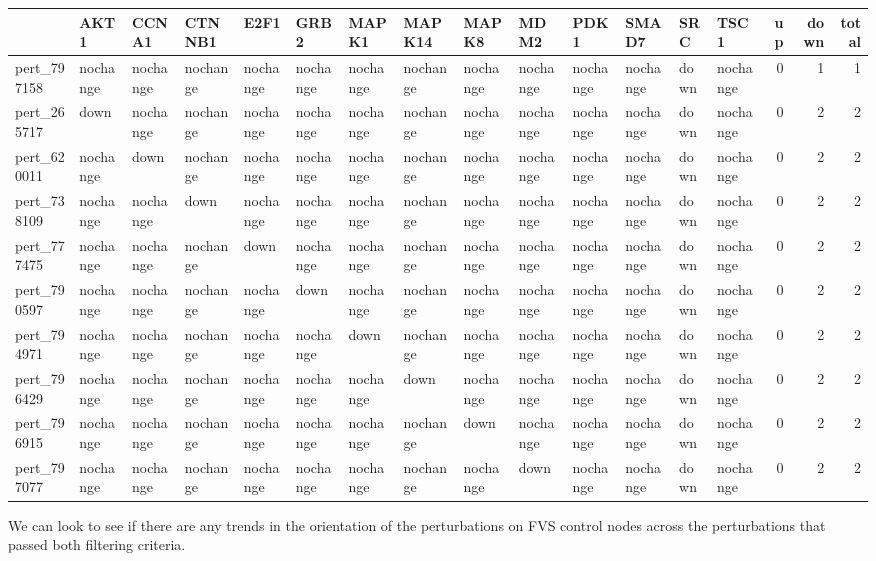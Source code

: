 \documentclass[
]{book}
\begin{document}
\begin{tabular}{l|l|l|l|l|l|l|l|l|l|l|l|l|l||>{}r|r|r}
\hline
  & AKT1 & CCNA1 & CTNNB1 & E2F1 & GRB2 & MAPK1 & MAPK14 & MAPK8 & MDM2 & PDK1 & SMAD7 & SRC & TSC1 & up & down & total\\
\hline
pert\_797158 & nochange & nochange & nochange & nochange & nochange & nochange & nochange & nochange & nochange & nochange & nochange & down & nochange & 0 & 1 & 1\\
\hline
pert\_265717 & down & nochange & nochange & nochange & nochange & nochange & nochange & nochange & nochange & nochange & nochange & down & nochange & 0 & 2 & 2\\
\hline
pert\_620011 & nochange & down & nochange & nochange & nochange & nochange & nochange & nochange & nochange & nochange & nochange & down & nochange & 0 & 2 & 2\\
\hline
pert\_738109 & nochange & nochange & down & nochange & nochange & nochange & nochange & nochange & nochange & nochange & nochange & down & nochange & 0 & 2 & 2\\
\hline
pert\_777475 & nochange & nochange & nochange & down & nochange & nochange & nochange & nochange & nochange & nochange & nochange & down & nochange & 0 & 2 & 2\\
\hline
pert\_790597 & nochange & nochange & nochange & nochange & down & nochange & nochange & nochange & nochange & nochange & nochange & down & nochange & 0 & 2 & 2\\
\hline
pert\_794971 & nochange & nochange & nochange & nochange & nochange & down & nochange & nochange & nochange & nochange & nochange & down & nochange & 0 & 2 & 2\\
\hline
pert\_796429 & nochange & nochange & nochange & nochange & nochange & nochange & down & nochange & nochange & nochange & nochange & down & nochange & 0 & 2 & 2\\
\hline
pert\_796915 & nochange & nochange & nochange & nochange & nochange & nochange & nochange & down & nochange & nochange & nochange & down & nochange & 0 & 2 & 2\\
\hline
pert\_797077 & nochange & nochange & nochange & nochange & nochange & nochange & nochange & nochange & down & nochange & nochange & down & nochange & 0 & 2 & 2\\
\hline
\end{tabular}

We can look to see if there are any trends in the orientation of the perturbations on FVS control nodes across the perturbations that passed both filtering criteria.
\end{document}
